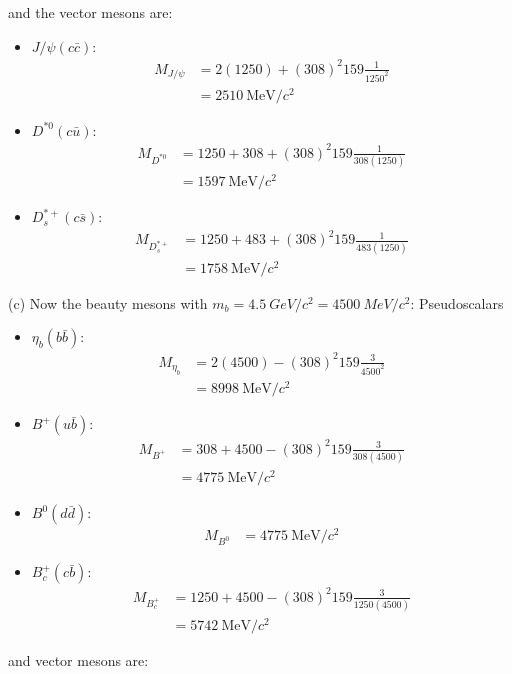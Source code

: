\documentclass[../main.tex]{subfiles}
\begin{document}
and the vector mesons are:
\begin{itemize}
    \item $J/\psi(c\bar c)$:
    \begin{align*}
        M_{J/\psi} &= 2(1250) + (308)^2 159 \frac{1}{1250^2} \\
        &= \qty{2510}{\MeV/c^2}
    \end{align*}
    \item $D^{*0}(c\bar u)$:
    \begin{align*}
        M_{D^{*0}} &= 1250 + 308 + (308)^2 159 \frac{1}{308(1250)} \\
        &= \qty{1597}{\MeV/c^2}
    \end{align*}
    \item $D_s^{*+}(c \bar s)$:
    \begin{align*}
        M_{D_s^{*+}} &= 1250 + 483 + (308)^2 159 \frac{1}{483(1250)} \\
        &= \qty{1758}{\MeV/c^2}
    \end{align*}
\end{itemize}
(c) Now the beauty mesons with $m_b = \qty{4.5}{GeV/c^2} = \qty{4500}{MeV/c^2}$: Pseudoscalars
\begin{itemize}
    \item $\eta_b(b\bar b)$:
    \begin{align*}
        M_{\eta_b} &= 2(4500) - (308)^2 159 \frac{3}{4500^2} \\
        &= \qty{8998}{\MeV/c^2}
    \end{align*}
    \item $B^+(u \bar b)$:
    \begin{align*}
        M_{B^+} &= 308 + 4500 - (308)^2 159 \frac{3}{308(4500)} \\
        &= \qty{4775}{\MeV/c^2}
    \end{align*}
    \item $B^0(d \bar d)$:
    \begin{align*}
        M_{B^0} &= \qty{4775}{\MeV/c^2}
    \end{align*}
    \item $B_c^+(c \bar b)$:
    \begin{align*}
        M_{B_c^+} &= 1250 + 4500 - (308)^2 159 \frac{3}{1250(4500)} \\
        &= \qty{5742}{\MeV/c^2}
    \end{align*}
\end{itemize}
and vector mesons are:
\end{document}
